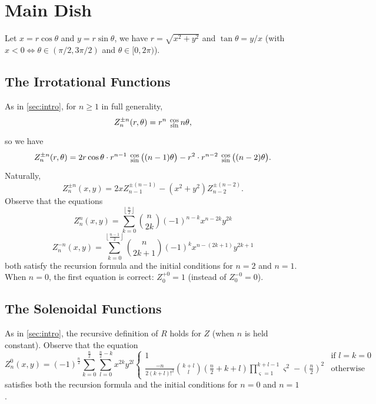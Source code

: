 \documentclass[twocolumn,showpacs,%
  nofootinbib,aps,superscriptaddress,%
  eqsecnum,prd,notitlepage,showkeys,10pt]{article}
\newcommand{\sincos}{\resizebox!{1em}{\(\begin{array}c\cos\vspace{-1ex}\\\sin\end{array}\)}\hspace{-.5ex}}
\begin{document}
\section{Main Dish}
\label{sec:maindish}

Let $x=r\cos\theta$ and $y=r\sin\theta$, we have $r=\sqrt{x^2+y^2}$ and $\tan\theta=y/x$ (with $x<0\iff\theta\in(\pi/2,3\pi/2)$ and $\theta\in[0,2\pi)$).

\subsection{The Irrotational Functions}
As in \ref{sec:intro}, for $n\geq1$ in full generality,
\[Z_n^{\pm n}(r,\theta)=r^n\sincos n\theta,\]
so we have
\[Z_n^{\pm n}(r,\theta)=2r\cos\theta\cdot r^{n-1}\sincos\big((n-1)\theta\big)-r^2\cdot r^{n-2}\sincos\big((n-2)\theta\big).\]
Naturally, 
\[Z_n^{\pm n}(x,y)=2xZ_{n-1}^{\pm(n-1)}-(x^2+y^2)Z_{n-2}^{\pm(n-2)}.\]
Observe that the equations
\[Z_n^n(x,y)=\sum_{k=0}^{\left\lfloor\frac n2\right\rfloor}\binom n{2k}(-1)^{n-k}x^{n-2k}y^{2k}\]
\[Z_n^{-n}(x,y)=\sum_{k=0}^{\left\lfloor\frac{n-1}2\right\rfloor}\binom n{2k+1}(-1)^kx^{n-(2k+1)}y^{2k+1}\]
both satisfy the recursion formula and the initial conditions for $n=2$ and $n=1$.  When $n=0$, the first equation is correct: $Z_0^{+0}=1$ (instead of $Z_0^{-0}=0$).

\subsection{The Solenoidal Functions}
As in \ref{sec:intro}, the recursive definition of $R$ holds for $Z$ (when $n$ is held constant).  Observe that the equation
\[Z_n^0(x,y)=(-1)^{\frac n2}\sum_{k=0}^{\frac n2}\sum_{l=0}^{\frac n2-k}x^{2k}y^{2l}\left\{\begin{array}{cl}1&\text{if }l=k=0\\\frac{-n}{2(k+l)!^2}\binom{k+l}l\left(\frac n2+k+l\right)\prod_{\varsigma=1}^{k+l-1}\varsigma^2-\left(\frac n2\right)^2&\text{otherwise}\end{array}\right.\]
satisfies both the recursion formula and the initial conditions for $n=0$ and $n=1$.
\end{document}
